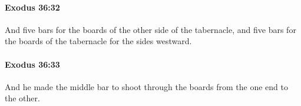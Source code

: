 		\paragraph{Exodus 36:32} %
			\label{EXODUS-36-32}

			And five bars for the boards of the other side of the tabernacle, and five bars for the boards of the tabernacle for the sides westward.


		\paragraph{Exodus 36:33} %
			\label{EXODUS-36-33}

			And he made the middle bar to shoot through the boards from the one end to the other.


